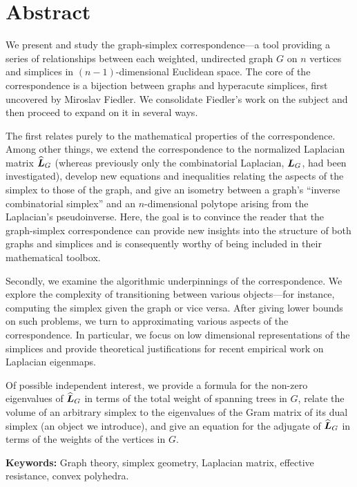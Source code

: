 \chapter*{Abstract}



We present and study the graph-simplex correspondence---a tool providing a series of relationships between each weighted, undirected graph  $G$ on $n$ vertices and simplices in $(n-1)$-dimensional Euclidean space. The core of the correspondence is a  bijection between graphs and hyperacute simplices, first uncovered by Miroslav Fiedler. We consolidate Fiedler's  work on  the subject and then  proceed to expand on it  in several  ways. 

The first relates purely to  the mathematical  properties  of the  correspondence. Among  other things, we extend the correspondence to the normalized Laplacian matrix $\widehat{\vb*{L}}_G$ (whereas previously only the combinatorial  Laplacian,  $\vb*{L}_G$, had been investigated), develop new equations and  inequalities relating the aspects  of the simplex to those of the graph, and give an isometry between a graph's ``inverse combinatorial  simplex''  and an $n$-dimensional polytope arising from the Laplacian's pseudoinverse. 
Here, the goal is to convince  the reader that the graph-simplex  correspondence can provide  new insights into the  structure of  both graphs and simplices and is consequently  worthy of being  included in their mathematical  toolbox.  

Secondly, we examine the algorithmic underpinnings of the correspondence. We explore the complexity of transitioning between various objects---for instance, computing the simplex given the graph or vice versa. After giving lower bounds on such problems, we turn to approximating various aspects of the correspondence. In particular, we focus on low dimensional representations of  the simplices and provide theoretical justifications for recent empirical  work on Laplacian eigenmaps. 

Of possible independent interest, we provide a formula for  the non-zero eigenvalues of $\widehat{\vb*{L}}_G$  in terms of the total weight of spanning trees in $G$, relate the volume of an arbitrary simplex to the eigenvalues of the Gram matrix of its dual simplex (an object we introduce), and give an equation for the adjugate of $\widehat{\vb*{L}}_G$ in terms of the weights of the vertices in  $G$.  
 


\vspace{1cm}
\noindent \textbf{Keywords:}  Graph theory,  simplex geometry, Laplacian matrix, effective resistance,  convex  polyhedra. 




